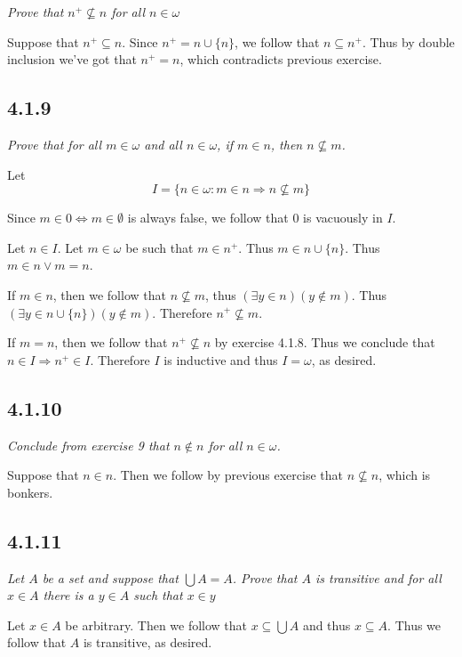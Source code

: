 \documentclass[11pt,oneside,titlepage]{book}
\DeclareMathOperator \lra {\Leftrightarrow}
\DeclareMathOperator \ra {\Rightarrow}
\begin{document}
\textit{Prove that $n^+ \not \subseteq n$ for all $n \in \omega$}

Suppose that $n^+ \subseteq n$. Since $n^+ = n \cup \{n\}$, we follow that $n \subseteq n^+$.
Thus by double inclusion we've got that $n^+ = n$, which contradicts previous exercise.


\subsection*{4.1.9}

\textit{Prove that for all $m \in \omega$ and all $n \in \omega$, if $m \in n$, then
  $n \not \subseteq m$.}

Let
$$I = \{n \in \omega: m \in n \ra n \not \subseteq m\}$$

Since $m \in 0 \lra m \in \emptyset$ is always false, we follow that $0$ is vacuously in $I$.

Let $n \in I$. Let $m \in \omega$ be such that $m \in n^+$.
Thus $m \in n \cup \{n\}$. Thus $m \in n \lor m = n$.

If $m \in n$, then we follow that $n \not \subseteq m$, thus $(\exists y \in n)(y \notin m)$.
Thus $(\exists y \in n \cup \{n\})(y \notin m)$. Therefore $n^+ \not \subseteq m$.

If $m = n$, then we follow that $n^+ \not \subseteq n$ by exercise 4.1.8.
Thus we conclude that $n \in I \ra n^+ \in I$. Therefore $I$ is inductive and thus $I = \omega$,
as desired.

\subsection*{4.1.10}

\textit{Conclude from exercise 9 that $n \notin n$ for all $n \in \omega$.}

Suppose that $n \in n$. Then we follow by previous exercise
that $n \not \subseteq n$, which is bonkers.

\subsection*{4.1.11}

\textit{Let $A$ be a set and suppose that $\bigcup A = A$. Prove that $A$ is transitive
  and for all $x \in A$ there is a $y \in A$ such that $x \in y$}

Let $x \in A$ be arbitrary.
Then we follow that $x \subseteq \bigcup A$ and thus $x \subseteq A$. Thus we follow that
$A$ is transitive, as desired.
\end{document}
